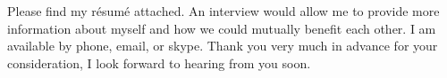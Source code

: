 \documentclass[11pt, a4paper]{awesome-cv}
\begin{document}
\begin{cvletter}
Please find my résumé attached. 
An interview would allow me to provide more information about myself and how we could mutually benefit each other.
I am available by phone, email, or skype.
Thank you very much in advance for your consideration, I look forward to hearing from you soon.


\end{cvletter}



\makeletterclosing
\end{document}

